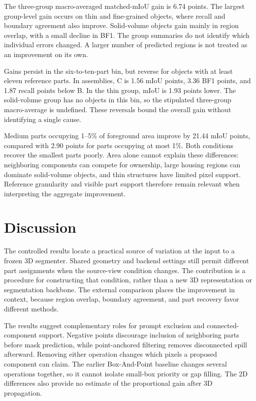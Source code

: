 \documentclass[pdflatex,iicol,sn-apa]{sn-jnl}
\begin{document}
The three-group macro-averaged matched-mIoU gain is 6.74 points. The largest group-level gain occurs on thin and fine-grained objects, where recall and boundary agreement also improve. Solid-volume objects gain mainly in region overlap, with a small decline in BF1. The group summaries do not identify which individual errors changed. A larger number of predicted regions is not treated as an improvement on its own.

Gains persist in the six-to-ten-part bin, but reverse for objects with at least eleven reference parts. In assemblies, C is 1.56 mIoU points, 3.36 BF1 points, and 1.87 recall points below B. In the thin group, mIoU is 1.93 points lower. The solid-volume group has no objects in this bin, so the stipulated three-group macro-average is undefined. These reversals bound the overall gain without identifying a single cause.

Medium parts occupying 1--5\% of foreground area improve by 21.44 mIoU points, compared with 2.90 points for parts occupying at most 1\%. Both conditions recover the smallest parts poorly. Area alone cannot explain these differences: neighboring components can compete for ownership, large housing regions can dominate solid-volume objects, and thin structures have limited pixel support. Reference granularity and visible part support therefore remain relevant when interpreting the aggregate improvement.

\section{Discussion}
\label{sec:discussion}

The controlled results locate a practical source of variation at the input to a frozen 3D segmenter. Shared geometry and backend settings still permit different part assignments when the source-view condition changes. The contribution is a procedure for constructing that condition, rather than a new 3D representation or segmentation backbone. The external comparison places the improvement in context, because region overlap, boundary agreement, and part recovery favor different methods.

The results suggest complementary roles for prompt exclusion and connected-component support. Negative points discourage inclusion of neighboring parts before mask prediction, while point-anchored filtering removes disconnected spill afterward. Removing either operation changes which pixels a proposed component can claim. The earlier Box-And-Point baseline changes several operations together, so it cannot isolate small-box priority or gap filling. The 2D differences also provide no estimate of the proportional gain after 3D propagation.
\end{document}
